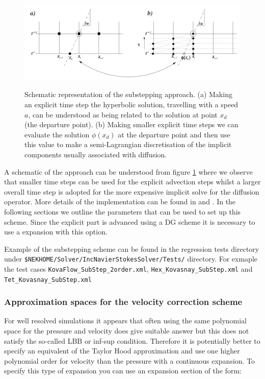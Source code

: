 \begin{figure}[!htbp]
\label{fig.substep}
  \centering
 {\includegraphics[width=1 \textwidth]{img/substepimage.png}}
   \caption {Schematic representation of the substepping approach. (a)
     Making an explicit time step the hyperbolic solution, travelling
     with a speed $a$, can be understood as being related to the
     solution at point $x_d$ (the departure point). (b) Making smaller
     explicit time steps we can evaluate the solution $\phi(x_d)$ at
     the departure point and then use this value to make a
     semi-Lagrangian discretisation of the implicit components usually
     associated with diffusion.}
\end{figure}


A schematic of the approach can be understood from figure
\ref{fig.substep} where we observe that smaller time steps can be used
for the explicit advection steps whilst a larger overall time step is
adopted for the more expensive implicit solve for the diffusion
operator. More details of the implementation can be found in
\cite{XiShDoKa} and \cite{Sh03}. In the following sections we outline
the parameters that can be used to set up this scheme. Since the
explicit part is advanced using a DG scheme it is necessary to use a
 expansion with this option.

\begin{notebox}
Example of the substepping scheme can be found in the regression tests
directory under
\texttt{\${NEKHOME}/Solver/IncNavierStokesSolver/Tests/} directory. For
exmaple the test cases \texttt{KovaFlow\_SubStep\_2order.xml},
\texttt{Hex\_Kovasnay\_SubStep.xml} and
\texttt{Tet\_Kovasnay\_SubStep.xml}
\end{notebox}

\subsubsection{Approximation spaces for the velocity correction scheme}

For well resolved simulations it appears that often using the same
polynomial space for the pressure and velocity does give suitable
answer but this does not satisfy the so-called LBB or inf-sup
condition. Therefore it is potentially better to specify an equivalent
of the Taylor Hood approximation and use one higher polynomial order
for velocity than the pressure with a continuous expansion. To specify
this type of expansion you can use an expansion section of the form:

